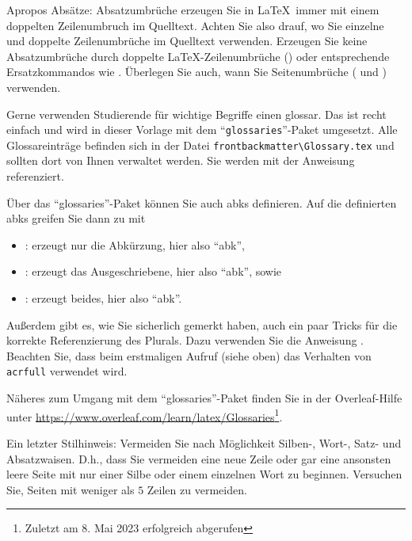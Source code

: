 Apropos Absätze: {\color{red}Absatzumbrüche erzeugen Sie in \LaTeX\ immer mit einem doppelten Zeilenumbruch im Quelltext.} Achten Sie also drauf, wo Sie einzelne und doppelte Zeilenumbrüche im Quelltext verwenden. Erzeugen Sie keine Absatzumbrüche durch doppelte \LaTeX{}-Zeilenumbrüche (\inlinecode{\textbackslash\textbackslash\textbackslash\textbackslash}) oder entsprechende Ersatzkommandos wie . Überlegen Sie auch, wann Sie Seitenumbrüche ( und ) verwenden.

Gerne verwenden Studierende für wichtige Begriffe einen \Gls{glossar}. Das ist recht einfach und wird in dieser Vorlage mit dem \enquote{\texttt{glossaries}}-Paket umgesetzt. Alle Glossareinträge befinden sich in der Datei \texttt{frontbackmatter\textbackslash Glossary.tex} und sollten dort von Ihnen verwaltet werden. Sie werden mit der Anweisung  referenziert.

Über das \enquote{glossaries}-Paket können Sie auch \Glspl{abk} definieren. Auf die definierten \Glspl{abk} greifen Sie dann zu mit
\begin{itemize}
    \item {}: erzeugt nur die Abkürzung, hier also \enquote{\acrshort{abk}},
    \item {}: erzeugt das Ausgeschriebene, hier also \enquote{\acrlong{abk}}, sowie
    \item {}: erzeugt beides, hier also \enquote{\acrfull{abk}}.
\end{itemize}

Außerdem gibt es, wie Sie sicherlich gemerkt haben, auch ein paar Tricks für die korrekte Referenzierung des Plurals. Dazu verwenden Sie die Anweisung . Beachten Sie, dass beim erstmaligen Aufruf (siehe oben) das Verhalten von \texttt{acrfull} verwendet wird.

Näheres zum Umgang mit dem \enquote{glossaries}-Paket finden Sie in der Overleaf-Hilfe unter \url{https://www.overleaf.com/learn/latex/Glossaries}\footnote{Zuletzt am 8. Mai 2023 erfolgreich abgerufen}.

Ein letzter Stilhinweis: Vermeiden Sie nach Möglichkeit Silben-, Wort-, Satz- und Absatzwaisen. D.h., dass Sie vermeiden eine neue Zeile oder gar eine ansonsten leere Seite mit nur einer Silbe oder einem einzelnen Wort zu beginnen. Versuchen Sie, Seiten mit weniger als $5$ Zeilen zu vermeiden.

